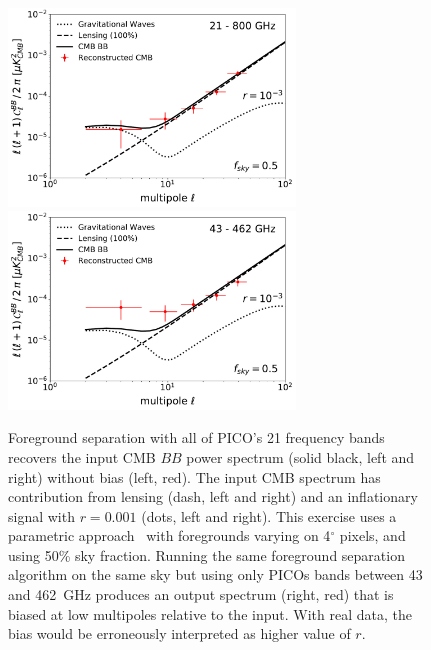 \documentclass[PICOReport.tex]{subfiles}
\begin{document}
\begin{figure}
\includegraphics[width=3in]{images/commander_pico_baseline.pdf}
\hspace{-0.0in}
\includegraphics[width=3in]{images/commander_pico_descoped.pdf}
\vspace{-0.1in}
\caption{\captiontext
Foreground separation with all of PICO's 21 frequency bands recovers the input CMB $BB$ power spectrum (solid black, left and right) without bias (left, red). The input CMB spectrum has contribution from lensing (dash, left and right) and an inflationary signal with $r=0.001$ (dots, left and right). This exercise uses a parametric approach~\citep{eriksen/etal:2008} with foregrounds varying on 4$^\circ$ pixels, and using 50\% sky fraction. Running the same foreground separation algorithm on the same sky but using only PICOs bands between 43 and 462~GHz produces an output spectrum (right, red) that is biased at low multipoles relative to the input. With real data, the bias would be erroneously interpreted as higher value of $r$. 
\label{fig:commander}}
\vspace{-0.1in}
\end{figure}
\end{document}
